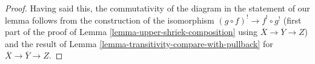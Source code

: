 \begin{proof}
\medskip\noindent
Having said this, the commutativity of the diagram in the statement
of our lemma follows from the construction of the isomorphism
$(g \circ f)^! \to f^! \circ g^!$ (first part of the proof of
Lemma \ref{lemma-upper-shriek-composition} using
$\overline{X} \to \overline{Y} \to Z$) and the result
of Lemma \ref{lemma-transitivity-compare-with-pullback}
for $\overline{X} \to \overline{Y} \to Z$.
\end{proof}
